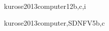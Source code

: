 \begin{syllabus}
\begin{unit}{\NCResourceAllocation}{}{kurose2013computer}{12}{b,c,i}
\begin{topics}%
    \item \NCResourceAllocationTopicNeed
    \item \NCResourceAllocationTopicFixed
    \item \NCResourceAllocationTopicEnd
    \item \NCResourceAllocationTopicFairness
    \item \NCResourceAllocationTopicPrinciples
    \item \NCResourceAllocationTopicApproaches
\end{topics}
\begin{learningoutcomes}
	\item \NCResourceAllocationLODescribeHowBe [\Familiarity]
	\item \NCResourceAllocationLODescribeTheInNetwork [\Familiarity]
	\item \NCResourceAllocationLOCompareAndAnd [\Familiarity]
	\item \NCResourceAllocationLOCompareAndApproaches [\Familiarity]
\end{learningoutcomes}
\end{unit}

\begin{unit}{\NCMobility}{}{kurose2013computer,SDNFV}{5}{b,c}
\begin{topics}%
    \item \NCMobilityTopicPrinciplesOf
    \item \NCMobilityTopicEight
    \item \NCMobilityTopicIssues
\end{topics}
\begin{learningoutcomes}
	\item \NCMobilityLODescribeTheA [\Familiarity]
	\item \NCMobilityLODescribeHowSupport [\Familiarity]
\end{learningoutcomes}
\end{unit}


\end{syllabus}
